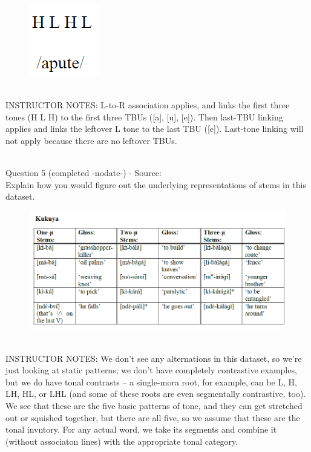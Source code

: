 \documentclass[12pt]{article}
\begin{document}
\begin{figure}[H]
\includegraphics{../images/mendetone_d.png}
\end{figure}

~\\
INSTRUCTOR NOTES: L-to-R association applies, and links the first three tones (H L H) to the first three TBUs ([a], [u], [e]). Then last-TBU linking applies and links the leftover L tone to the last TBU ([e]). Last-tone linking will not apply because there are no leftover TBUs.


~\\

{\large Question 5} (completed -nodate-) - Source: \\

Explain how you would figure out the underlying representations of stems in this dataset.\\

\begin{figure}[H]
\includegraphics{../images/kukuya.png}
\end{figure}

~\\
INSTRUCTOR NOTES: We don't see any alternations in this dataset, so we're just looking at static patterns; we don't have completely contrastive examples, but we do have tonal contrasts -- a single-mora root, for example, can be L, H, LH, HL, or LHL (and some of these roots are even segmentally contrastive, too). We see that these are the five basic patterns of tone, and they can get stretched out or squished together, but there are all five, so we assume that these are the tonal invntory. For any actual word, we take its segments and combine it (without associaton lines) with the appropriate tonal category.
\end{document}
